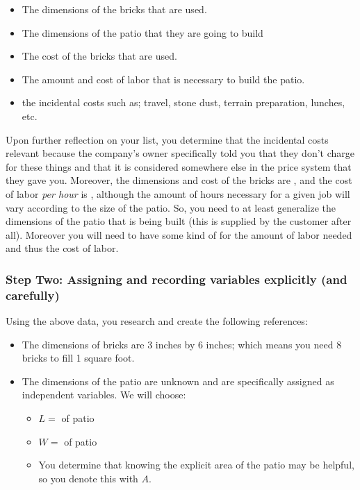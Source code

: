 \documentclass{ximeraXloud}
\begin{document}
\begin{example}
        \begin{itemize}
            \item The dimensions of the bricks that are used.
            \item The dimensions of the patio that they are going to build
            \item The cost of the bricks that are used.
            \item The amount and cost of labor that is necessary to build the patio.
            \item the incidental costs such as; travel, stone dust, terrain preparation, lunches, etc.
        \end{itemize}
        
        Upon further reflection on your list, you determine that the incidental costs  relevant because the company's owner specifically told you that they don't charge for these things and that it is considered somewhere else in the price system that they gave you. Moreover, the dimensions and cost of the bricks are  , and the cost of labor \textit{per hour} is , although the amount of hours necessary for a given job will vary according to the size of the patio. So, you need to at least generalize the dimensions of the patio that is being built (this is supplied by the customer after all). Moreover you will need to have some kind of  for the amount of labor needed and thus the cost of labor. 
    
    \subsubsection*{Step Two: Assigning and recording variables explicitly (and carefully)}
        Using the above data, you research and create the following references:
        
        \begin{itemize}
            \item The dimensions of bricks are 3 inches by 6 inches; which means you need 8 bricks to fill 1 square foot.
            \item The dimensions of the patio are unknown and are specifically assigned as independent variables. We will choose:
            \begin{itemize}
                \item $L =$  of patio
                \item $W =$  of patio
                \item You determine that knowing the explicit area of the patio may be helpful, so you denote this with $A$.
            \end{itemize}
            

\end{itemize}
\end{example}
\end{document}
